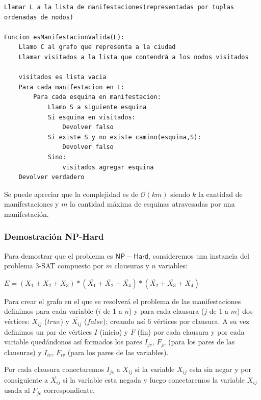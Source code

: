 \begin{verbatim}
Llamar L a la lista de manifestaciones(representadas por tuplas ordenadas de nodos)

Funcion esManifestacionValida(L):
    Llamo C al grafo que representa a la ciudad
    Llamar visitados a la lista que contendrá a los nodos visitados
    
    visitados es lista vacia
    Para cada manifestacion en L:
        Para cada esquina en manifestacion:
            Llamo S a siguiente esquina
            Si esquina en visitados:
                Devolver falso
            Si existe S y no existe camino(esquina,S):
                Devolver falso
            Sino:
                visitados agregar esquina
    Devolver verdadero
\end{verbatim}

Se puede apreciar que la complejidad es de $\mathcal{O}(km)$ siendo $k$ la cantidad de manifestaciones y $m$ la cantidad máxima de esquinas atravesadas por una manifestación.

\subsubsection{Demostración NP-Hard}
Para demostrar que el problema es $\mathsf{NP-Hard}$, consideremos una instancia del problema 3-SAT compuesto por $m$ clausuras y $n$ variables:\newline

$E = (X_{1}+X_{2}+X_{3})*(\overline{X_{1}}+\overline{X_{2}}+\overline{X_{4}})*(\overline{X_{2}}+\overline{X_{3}}+X_{4})$\newline

Para crear el grafo en el que se resolverá el problema de las manifestaciones definimos para cada variable ($i$ de $1$ a $n$) y para cada clausura ($j$ de $1$ a $m$) dos vértices: $X_{ij}$ ($true$) y $\overline{X_{ij}}$ ($false$); creando así 6 vértices por clausura. A su vez definimos un par de vértices $I$ (inicio) y $F$ (fin) por cada clausura y por cada variable quedándonos así formados los pares $I_{jc}$, $F_{jc}$ (para los pares de las clausuras) y $I_{iv}$, $F_{iv}$ (para los pares de las variables).\newline

Por cada clausura conectaremos $I_{jc}$ a $X_{ij}$ si la variable $X_{ij}$ esta sin negar y por consiguiente a $\overline{X_{ij}}$ si la variable esta negada y luego conectaremos la variable $X_{ij}$ usada al $F_{jc}$ correspondiente.\newline

